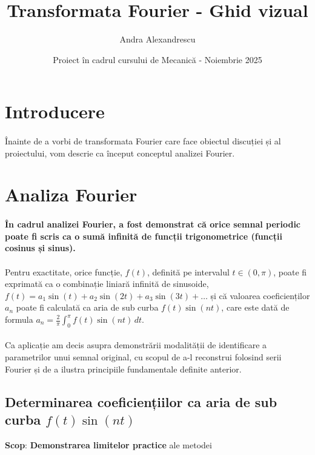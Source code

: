 \documentclass{article}
\title{Transformata Fourier - Ghid vizual}
\author{Andra Alexandrescu}
\date{Proiect în cadrul cursului de Mecanică - Noiembrie 2025}
\begin{document}
\maketitle

\section*{Introducere}
\paragraph{}Înainte de a vorbi de transformata Fourier care face obiectul discuției și al proiectului, vom descrie ca început conceptul analizei Fourier.
\section*{Analiza Fourier}
\paragraph{În cadrul analizei Fourier, a fost demonstrat că orice semnal periodic poate fi scris ca o sumă infinită de funcții trigonometrice (funcții cosinus și sinus).}

\paragraph{}Pentru exactitate, orice funcție, \(f(t)\), definită pe intervalul \(t \in (0,\pi)\), poate fi exprimată ca o combinație liniară infinită de sinusoide, \(f(t) = a_1\sin(t)+a_2\sin(2t)+a_3\sin(3t)+\ldots\) și că valoarea coeficienților \(a_n\) poate fi calculată ca aria de sub curba \(f(t) \sin(nt)\), care este dată de formula \(a_n = \frac{2}{\pi} \int_{0}^{\pi} f(t)\sin(n t)\, dt\).

\paragraph{} Ca aplicație am decis asupra demonstrării modalității de identificare a parametrilor unui semnal original, cu scopul de a-l reconstrui folosind serii Fourier și de a ilustra principiile fundamentale definite anterior. 

\subsection*{ Determinarea coeficiențiilor ca aria de sub curba \(f(t) \sin(nt)\) }
    \textbf{Scop}: \textbf{Demonstrarea limitelor practice} ale metodei
\end{document}
